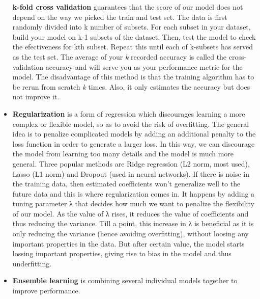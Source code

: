 \documentclass[
  letterpaper,
]{book}
\begin{document}
\begin{itemize}
  \textbf{k-fold cross validation} guarantees that the score of our
  model does not depend on the way we picked the train and test set. The
  data is first randomly divided into k number of subsets. For each
  subset in your dataset, build your model on k-1 subsets of the
  dataset. Then, test the model to check the efectiveness for kth
  subset. Repeat this until each of k-subsets has served as the test
  set. The average of your \emph{k} recorded accuracy is called the
  cross-validation accuracy and will serve you as your performance
  metric for the model. The disadvantage of this method is that the
  training algorithm has to be rerun from scratch \emph{k} times. Also,
  it only estimates the accuracy but does not improve it.
\item
  \textbf{Regularization} is a form of regression which discourages
  learning a more complex or flexible model, so as to avoid the risk of
  overfitting. The general idea is to penalize complicated models by
  adding an additional penalty to the loss function in order to generate
  a larger loss. In this way, we can discourage the model from learning
  too many details and the model is much more general. Three popular
  methods are Ridge regression (L2 norm, most used), Lasso (L1 norm) and
  Dropout (used in neural networks). If there is noise in the training
  data, then estimated coefficients won't generalize well to the future
  data and this is where regularization comes in. It happens by adding a
  tuning parameter λ that decides how much we want to penalize the
  flexibility of our model. As the value of λ rises, it reduces the
  value of coefficients and thus reducing the variance. Till a point,
  this increase in λ is beneficial as it is only reducing the variance
  (hence avoiding overfitting), without loosing any important properties
  in the data. But after certain value, the model starts lossing
  important properties, giving rise to bias in the model and thus
  underfitting.
\item
  \textbf{Ensemble learning} is combining several individual models
  together to improve performance.


\end{itemize}
\end{document}

